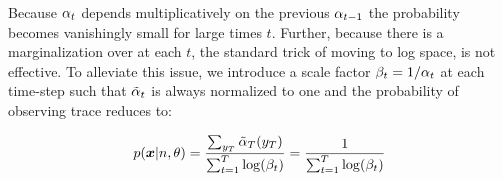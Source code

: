 Because $\alpha_{t}$ depends multiplicatively on the previous $\alpha_{t-1}$ the probability becomes vanishingly small for large times $t$. Further, because there is a marginalization over \states at each $t$, the standard trick of moving to log space, is not effective. To alleviate this issue, we introduce a scale factor $\beta_{t} = 1 / \alpha_{t}$ at each time-step such that $\tilde{\alpha}_{t}$ is always normalized to one and the probability of observing trace \trace reduces to:

\begin{equation}
	p(\bm{x} | n, \theta)
    = \frac
      {\sum_{y_{T}}\tilde{\alpha}_{T}(y_{T})}
      {\sum_{t=1}^{T} \log(\beta_{t})}
    = \frac
      {1}
      {\sum_{t=1}^{T} \log(\beta_{t})}
\end{equation}
